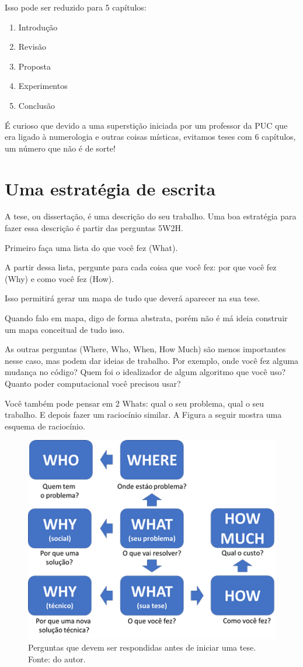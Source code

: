 Isso pode ser reduzido para 5 capítulos:
\begin{enumerate}
    \item	Introdução
   \item	Revisão
   \item	Proposta
   \item	Experimentos
   \item	Conclusão
\end{enumerate}

É curioso que devido a uma superstição iniciada por um professor da PUC que era ligado à numerologia e outras coisas místicas, evitamos teses com 6 capítulos, um número que não é de sorte!

\section{Uma estratégia de escrita}

A tese, ou dissertação, é uma descrição do seu trabalho. Uma boa estratégia para fazer essa descrição é partir das perguntas 5W2H.

Primeiro faça uma lista do que você fez (What).

A partir dessa lista, pergunte para cada coisa que você fez: por que você fez (Why) e como você fez (How).

Isso permitirá gerar um mapa de tudo que deverá aparecer na sua tese.

Quando falo em mapa, digo de forma abstrata, porém não é má ideia construir um mapa conceitual de tudo isso.

As outras perguntas (Where, Who, When, How Much) são menos importantes nesse caso, mas podem dar ideias de trabalho. Por exemplo, onde você fez alguma mudança no código? Quem foi o idealizador de algum algoritmo que você uso? Quanto poder computacional você precisou usar?

Você também pode pensar em 2 Whats: qual o seu problema, qual o seu trabalho. E depois fazer um raciocínio similar. A Figura a seguir mostra uma esquema de raciocínio.

\begin{figure}[hbt]
    \centering
    \includegraphics[width=0.7\linewidth]{Images/5w2h}
    \caption{Perguntas que devem ser respondidas antes de iniciar uma tese. Fonte: do autor.}
    \label{fig:5w2h2}
\end{figure}

